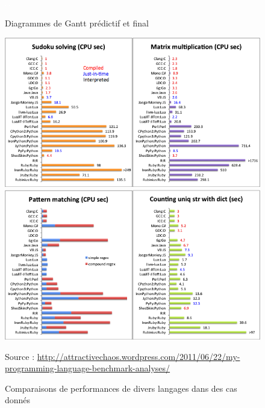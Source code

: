 \documentclass[a4paper]{memoir}
\begin{document}
		\section*{}
			\begin{figure}
				\vspace{-3,5cm} \hspace{-4,5cm} \includegraphics[scale=0.6]{img/Gantt1.png}
				\vspace{-3,5cm} \hspace{-4,5cm} \includegraphics[scale=0.6]{img/Gantt2.png}
				\label{fig:gantt}
				\vspace{-0,5cm} \caption{Diagrammes de Gantt prédictif et final}
			\end{figure}
			
			\begin{figure}
				\begin{center}
					\includegraphics[scale=0.5]{img/AnalyseLangage1.png}
					\includegraphics[scale=0.5]{img/AnalyseLangage2.png} 
				\end{center}
				\label{fig:analyse}
				\caption{Comparaisons de performances de divers langages dans des cas donnés}
				Source : \url{http://attractivechaos.wordpress.com/2011/06/22/my-programming-language-benchmark-analyses/}
			\end{figure}
			
\end{document}
